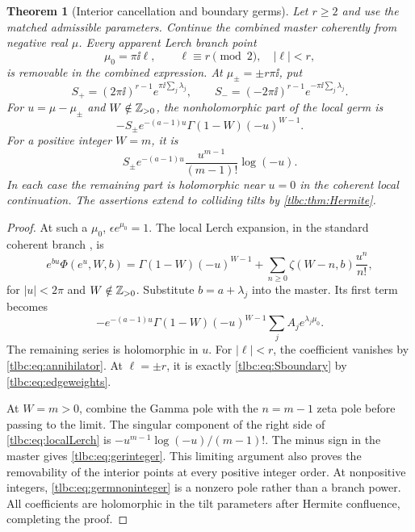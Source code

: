 \documentclass[11pt,letterpaper]{article}
\numberwithin{equation}{section}
\newtheorem{theorem}{Theorem}[section]
\theoremstyle{definition}\newtheorem{definition}[theorem]{Definition}
\theoremstyle{remark}\newtheorem{remark}[theorem]{Remark}
\begin{document}
\begin{theorem}[Interior cancellation and boundary germs]\label{tlbc:thm:branches}
Let $r\ge2$ and use the matched admissible parameters. Continue the combined master coherently from negative real $\mu$. Every apparent Lerch branch point
\[
 \mu_0=\pi\ii\ell,\qquad \ell\equiv r\pmod2,\quad |\ell|<r,
\]
is removable in the combined expression. At $\mu_\pm=\pm r\pi\ii$, put
\begin{equation}\label{tlbc:eq:Sboundary}
 S_+=(2\pi\ii)^{r-1}e^{\pi\ii\sum_j\lambda_j},\qquad
 S_-=(-2\pi\ii)^{r-1}e^{-\pi\ii\sum_j\lambda_j}.
\end{equation}
For $u=\mu-\mu_\pm$ and $W\notin\mathbb Z_{>0}$, the nonholomorphic part of the local germ is
\begin{equation}\label{tlbc:eq:germnoninteger}
 -S_\pm e^{-(a-1)u}\Gamma(1-W)(-u)^{W-1}.
\end{equation}
For a positive integer $W=m$, it is
\begin{equation}\label{tlbc:eq:gerinteger}
 S_\pm e^{-(a-1)u}\frac{u^{m-1}}{(m-1)!}\log(-u).
\end{equation}
In each case the remaining part is holomorphic near $u=0$ in the coherent local continuation. The assertions extend to colliding tilts by \cref{tlbc:thm:Hermite}.
\end{theorem}
\begin{proof}
At such a $\mu_0$, $\epsilon e^{\mu_0}=1$. The local Lerch expansion, in the standard coherent branch \cite{DLMF}, is
\begin{equation}\label{tlbc:eq:localLerch}
 e^{bu}\Phi(e^u,W,b)=\Gamma(1-W)(-u)^{W-1}
       +\sum_{n\ge0}\zeta(W-n,b)\frac{u^n}{n!},
\end{equation}
for $|u|<2\pi$ and $W\notin\mathbb Z_{>0}$. Substitute $b=a+\lambda_j$ into the master. Its first term becomes
\[
 -e^{-(a-1)u}\Gamma(1-W)(-u)^{W-1}
       \sum_j A_j e^{\lambda_j\mu_0}.
\]
The remaining series is holomorphic in $u$. For $|\ell|<r$, the coefficient vanishes by \eqref{tlbc:eq:annihilator}. At $\ell=\pm r$, it is exactly \eqref{tlbc:eq:Sboundary} by \eqref{tlbc:eq:edgeweights}.

At $W=m>0$, combine the Gamma pole with the $n=m-1$ zeta pole before passing to the limit. The singular component of the right side of \eqref{tlbc:eq:localLerch} is
$-u^{m-1}\log(-u)/(m-1)!$. The minus sign in the master gives \eqref{tlbc:eq:gerinteger}. This limiting argument also proves the removability of the interior points at every positive integer order. At nonpositive integers, \eqref{tlbc:eq:germnoninteger} is a nonzero pole rather than a branch power. All coefficients are holomorphic in the tilt parameters after Hermite confluence, completing the proof.
\end{proof}
\end{document}
